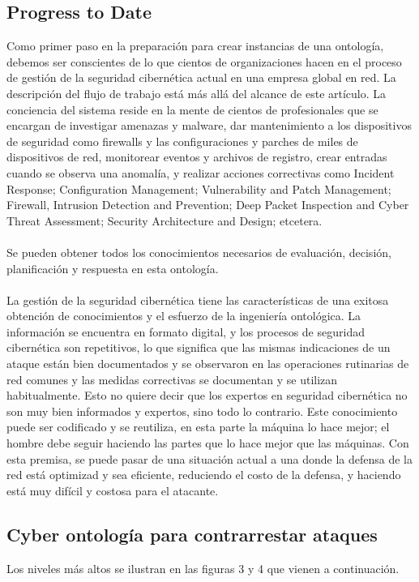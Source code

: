 \documentclass[journal]{IEEEtran}
\begin{document}
\subsection{Progress to Date}
Como primer paso en la preparación para crear instancias de una ontología, debemos ser conscientes de lo que cientos de organizaciones hacen en el proceso de gestión de la seguridad cibernética actual en una empresa global en red. La descripción del flujo de trabajo está más allá del alcance de este artículo. La conciencia del sistema reside en la mente de cientos de profesionales que se encargan de investigar amenazas y malware, dar mantenimiento a los dispositivos de seguridad como firewalls y las configuraciones y parches de miles de dispositivos de red, monitorear eventos y archivos de registro, crear entradas cuando se observa una anomalía, y realizar acciones correctivas como  Incident Response; Configuration Management; Vulnerability and Patch Management; Firewall, Intrusion Detection and Prevention; Deep Packet Inspection and Cyber Threat Assessment; Security Architecture and Design; etcetera.\\ \\
Se pueden obtener todos los conocimientos necesarios de evaluación, decisión, planificación y respuesta en esta ontología.\\ \\
La gestión de la seguridad cibernética tiene las características de una exitosa obtención de conocimientos y el esfuerzo de la ingeniería ontológica. La información se encuentra en formato digital, y los procesos de seguridad cibernética son repetitivos, lo que significa que las mismas indicaciones de un ataque están bien documentados y se observaron en las operaciones rutinarias de red comunes y las medidas correctivas se documentan y se utilizan habitualmente. Esto no quiere decir que los expertos en seguridad cibernética no son muy bien informados y expertos, sino todo lo contrario. Este conocimiento puede ser codificado y se reutiliza, en esta parte la máquina lo hace mejor; el hombre debe seguir haciendo las partes que lo hace mejor que las máquinas. Con esta premisa, se puede pasar de una situación actual a una donde la defensa de la red está optimizad y sea eficiente, reduciendo el costo de la defensa, y haciendo está muy difícil y costosa para el atacante.

\subsection{Cyber ontología para contrarrestar ataques}
Los niveles más altos se ilustran en las figuras 3 y 4 que vienen a continuación.
\end{document}
